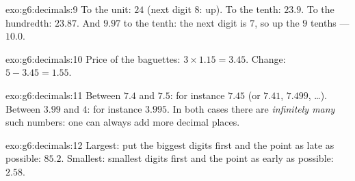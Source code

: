 \begin{solution}{exo:g6:decimals:9}
To the unit: $24$ (next digit $8$:  up). To the tenth: $23.9$.
To the hundredth: $23.87$. And $9.97$ to the tenth: the next digit is
$7$, so  up the $9$ tenths --- $10.0$.
\end{solution}

\begin{solution}{exo:g6:decimals:10}
Price of the baguettes: $3 \times 1.15 = 3.45$. Change:
$5 - 3.45 = 1.55$.
\end{solution}

\begin{solution}{exo:g6:decimals:11}
Between $7.4$ and $7.5$: for instance $7.45$ (or $7.41$, $7.499$,
\dots). Between $3.99$ and $4$: for instance $3.995$. In both cases
there are \emph{infinitely many} such numbers: one can always add more
decimal places.
\end{solution}

\begin{solution}{exo:g6:decimals:12}
Largest: put the biggest digits first and the point as late as
possible: $85.2$. Smallest: smallest digits first and the point as
early as possible: $2.58$.
\end{solution}

